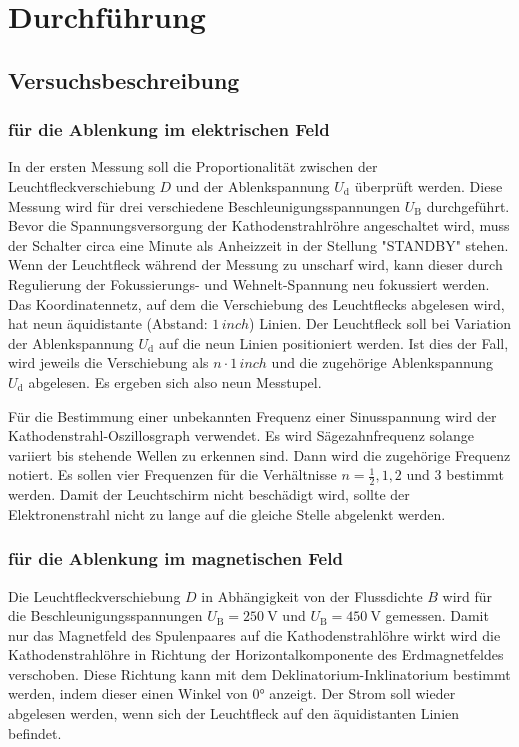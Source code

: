 \section{Durchführung}
\label{sec:Durchführung}



\subsection{Versuchsbeschreibung}
\subsubsection{für die Ablenkung im elektrischen Feld}
In der ersten Messung soll die Proportionalität zwischen der Leuchtfleckverschiebung $D$ und der
Ablenkspannung $U_{\mathrm{d}}$ überprüft werden. Diese Messung wird für drei verschiedene
Beschleunigungsspannungen $U_{\mathrm{B}}$ durchgeführt.
Bevor die Spannungsversorgung der Kathodenstrahlröhre angeschaltet wird, muss der Schalter
circa eine Minute als Anheizzeit in der Stellung "STANDBY" stehen. Wenn der Leuchtfleck
während der Messung zu unscharf wird, kann dieser durch Regulierung der Fokussierungs- und
Wehnelt-Spannung neu fokussiert werden.
Das Koordinatennetz, auf dem die Verschiebung des Leuchtflecks abgelesen wird, hat neun
äquidistante (Abstand: $1\,inch$) Linien. Der Leuchtfleck soll bei Variation der 
Ablenkspannung $U_{\mathrm{d}}$ auf die neun Linien positioniert werden. Ist dies der Fall,
wird jeweils die Verschiebung als $n\cdot 1\,inch$ und die zugehörige Ablenkspannung
$U_{\mathrm{d}}$ abgelesen. Es ergeben sich also neun Messtupel.

Für die Bestimmung einer unbekannten Frequenz einer Sinusspannung wird der
Kathodenstrahl-Oszillosgraph verwendet. Es wird Sägezahnfrequenz solange variiert bis
stehende Wellen zu erkennen sind. Dann wird die zugehörige Frequenz notiert.
Es sollen vier Frequenzen für die Verhältnisse $n = \frac{1}{2}, 1, 2$ und $3$ bestimmt werden.
Damit der Leuchtschirm nicht beschädigt wird, sollte der Elektronenstrahl nicht zu lange auf
die gleiche Stelle abgelenkt werden.

\subsubsection{für die Ablenkung im magnetischen Feld}
Die Leuchtfleckverschiebung $D$ in Abhängigkeit von der Flussdichte $B$ wird für die
Beschleunigungsspannungen $U_{\mathrm{B}}=\SI{250}{\volt}$ und $U_{\mathrm{B}}=\SI{450}{\volt}$
gemessen. Damit nur das Magnetfeld des Spulenpaares auf die Kathodenstrahlöhre wirkt
wird die Kathodenstrahlöhre in Richtung der Horizontalkomponente des Erdmagnetfeldes verschoben.
Diese Richtung kann mit dem Deklinatorium-Inklinatorium bestimmt werden, indem dieser einen
Winkel von $0°$ anzeigt. Der Strom soll wieder abgelesen werden, wenn sich der
Leuchtfleck auf den äquidistanten Linien befindet.

